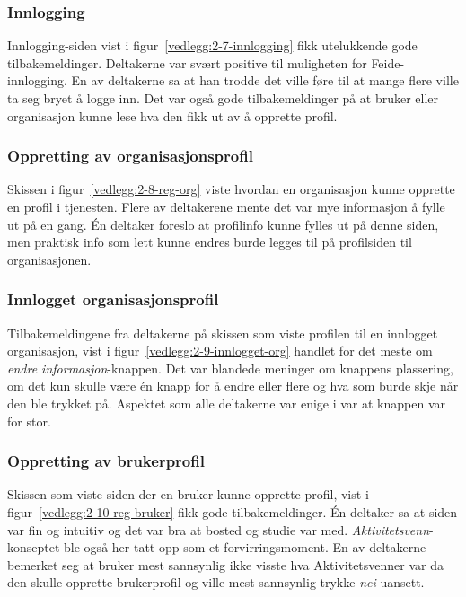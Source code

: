 \subsubsection{Innlogging}

Innlogging-siden vist i figur~\ref{vedlegg:2-7-innlogging} fikk utelukkende gode tilbakemeldinger. Deltakerne var svært positive til muligheten for Feide-innlogging. En av deltakerne sa at han trodde det ville føre til at mange flere ville ta seg bryet å logge inn. Det var også gode tilbakemeldinger på at bruker eller organisasjon kunne lese hva den fikk ut av å opprette profil.


\subsubsection{Oppretting av organisasjonsprofil}

Skissen i figur~\ref{vedlegg:2-8-reg-org} viste hvordan en organisasjon kunne opprette en profil i tjenesten. Flere av deltakerene mente det var mye informasjon å fylle ut på en gang. Én deltaker foreslo at profilinfo kunne fylles ut på denne siden, men praktisk info som lett kunne endres burde legges til på profilsiden til organisasjonen.


\subsubsection{Innlogget organisasjonsprofil}

Tilbakemeldingene fra deltakerne på skissen som viste profilen til en innlogget organisasjon, vist i figur~\ref{vedlegg:2-9-innlogget-org} handlet for det meste om {\em  endre informasjon}-knappen. Det var blandede meninger om knappens plassering, om det kun skulle være én knapp for å endre eller flere og hva som burde skje når den ble trykket på. Aspektet som alle deltakerne var enige i var at knappen var for stor.


\subsubsection{Oppretting av brukerprofil}

Skissen som viste siden der en bruker kunne opprette profil, vist i figur~\ref{vedlegg:2-10-reg-bruker} fikk gode tilbakemeldinger. Én deltaker sa at siden var fin og intuitiv og det var bra at bosted og studie var med. {\em  Aktivitetsvenn}-konseptet ble også her tatt opp som et forvirringsmoment. En av deltakerne bemerket seg at bruker mest sannsynlig ikke visste hva Aktivitetsvenner var da den skulle opprette brukerprofil og ville mest sannsynlig trykke {\em  nei} uansett.


